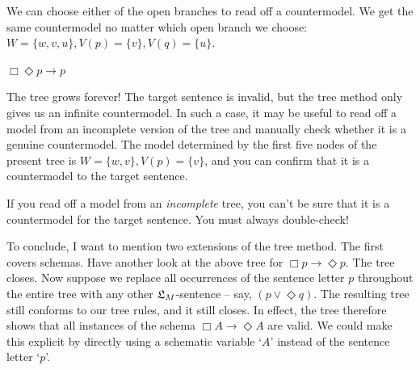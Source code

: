 \begin{solution}
\begin{sollist}
  \medskip\noindent
  We can choose either of the open branches to read off a countermodel. We get the same countermodel no matter which open branch we choose:
  $W = \{ w,v,u \}, V(p)=\{ v\}, V(q)=\{u\}$.
                
\medskip

    
  \item[(j)] $\Box \Diamond p \to p$
  

  \medskip\noindent The tree grows forever! The target sentence is invalid, but
  the tree method only gives us an infinite countermodel. In such a case, it may
  be useful to read off a model from an incomplete version of the tree and
  manually check whether it is a genuine countermodel. The model determined by
  the first five nodes of the present tree is $W = \{ w,v \}, V(p)=\{ v \}$,
  and you can confirm that it is a countermodel to the target sentence.

  If you read off a model from an \emph{incomplete} tree, you can't be sure that
  it is a countermodel for the target sentence. You must always double-check!
   
  \end{sollist}
  
\end{solution}

To conclude, I want to mention two extensions of the tree method. The first
covers schemas. Have another look at the above tree for $\Box p \to \Diamond p$.
The tree closes. Now suppose we replace all occurrences of the sentence letter
$p$ throughout the entire tree with any other $\mathfrak{L}_M$-sentence -- say,
$(p \lor \Diamond q)$. The resulting tree still conforms to our tree rules, and
it still closes. In effect, the tree therefore shows that all instances of the
schema $\Box A \to \Diamond A$ are valid. We could make this explicit by
directly using a schematic variable `$A$' instead of the sentence letter `$p$'.

